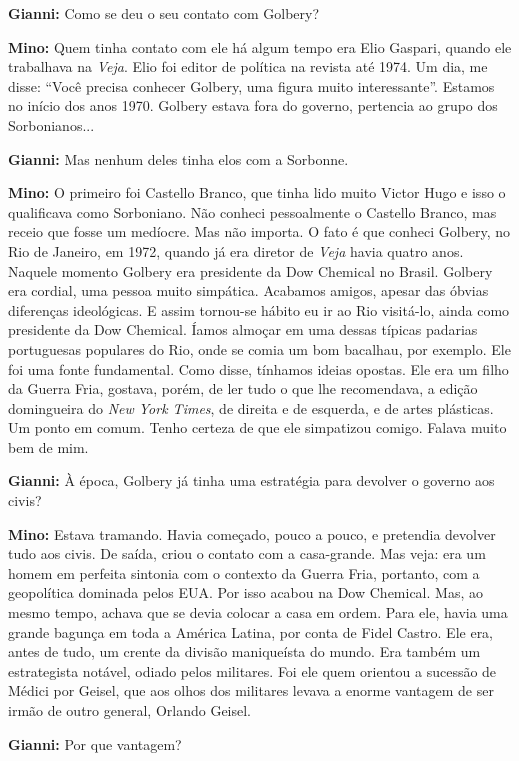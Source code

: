 \textbf{Gianni:} Como se deu o seu contato com Golbery?

\textbf{Mino:} Quem tinha contato com ele há algum tempo era Elio
Gaspari, quando ele trabalhava na \emph{Veja}. Elio foi editor de
política na revista até 1974. Um dia, me disse: ``Você precisa conhecer
Golbery, uma figura muito interessante''. Estamos no início dos anos
1970. Golbery estava fora do governo, pertencia ao grupo dos
Sorbonianos...

\textbf{Gianni:} Mas nenhum deles tinha elos com a Sorbonne.

\textbf{Mino:} O primeiro foi Castello Branco, que tinha lido muito
Victor Hugo e isso o qualificava como Sorboniano. Não conheci
pessoalmente o Castello Branco, mas receio que fosse um medíocre. Mas
não importa. O fato é que conheci Golbery, no Rio de Janeiro, em 1972,
quando já era diretor de \emph{Veja} havia quatro anos. Naquele momento
Golbery era presidente da Dow Chemical no Brasil. Golbery era cordial,
uma pessoa muito simpática. Acabamos amigos, apesar das óbvias
diferenças ideológicas. E assim tornou-se hábito eu ir ao Rio visitá-lo,
ainda como presidente da Dow Chemical. Íamos almoçar em uma dessas
típicas padarias portuguesas populares do Rio, onde se comia um bom
bacalhau, por exemplo. Ele foi uma fonte fundamental. Como disse,
tínhamos ideias opostas. Ele era um filho da Guerra Fria, gostava,
porém, de ler tudo o que lhe recomendava, a edição domingueira do
\emph{New York Times}, de direita e de esquerda, e de artes plásticas.
Um ponto em comum. Tenho certeza de que ele simpatizou comigo. Falava
muito bem de mim.

\textbf{Gianni:} À época, Golbery já tinha uma estratégia para devolver
o governo aos civis?

\textbf{Mino:} Estava tramando. Havia começado, pouco a pouco, e
pretendia devolver tudo aos civis. De saída, criou o contato com a
casa-grande. Mas veja: era um homem em perfeita sintonia com o contexto
da Guerra Fria, portanto, com a geopolítica dominada pelos EUA. Por isso
acabou na Dow Chemical. Mas, ao mesmo tempo, achava que se devia colocar
a casa em ordem. Para ele, havia uma grande bagunça em toda a América
Latina, por conta de Fidel Castro. Ele era, antes de tudo, um crente da
divisão maniqueísta do mundo. Era também um estrategista notável, odiado
pelos militares. Foi ele quem orientou a sucessão de Médici por Geisel,
que aos olhos dos militares levava a enorme vantagem de ser irmão de
outro general, Orlando Geisel.

\textbf{Gianni:} Por que vantagem?

